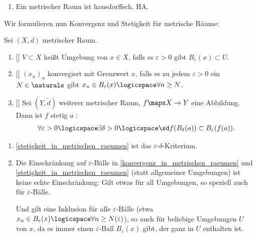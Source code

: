 \begin{bemerkungen}
\begin{enumerate}
\begin{proof}
        \end{proof}
        
        \item \label{metrischer_raum_ist_hausdorffsch} Ein metrischer Raum ist hausdorffsch. \tto HA\@.
        
    \end{enumerate}
\end{bemerkungen}
Wir formulieren nun Konvergenz und Stetigkeit für metrische Räume:
\begin{bemerkungen}
    Sei \( (X,d) \) metrischer Raum.
    \begin{enumerate}
        \item {}[]\label{umgebung_in_metrischen_raeumen} \( V\subset X \) heißt Umgebung von \( x\in X \), falls es \( \varepsilon >0 \) gibt \sd \( B_\varepsilon(x)\subset U \).
        \item {}[]\label{konvergenz_in_metrischen_raeumen} \( (x_n)_n \) konvergiert mit Grenzwert \( x \), falls es zu jedem \( \varepsilon>0 \) ein \( N\in \naturals \) gibt \sd \( x_n\in B_\varepsilon(x)\logicspace\forall n\geq N \).
        \item {}[]\label{stetigkeit_in_metrischen_raeumen} Sei \( (Y,\tilde{d}) \) weiterer metrischer Raum, \( f\maps X \to Y \) eine Abbildung. Dann ist \( f \) stetig \( a \) \gdw:
        \begin{align*}
            \forall\varepsilon>0\logicspace\exists \delta>0\logicspace\text{\sd} f(B_\delta(a))\subset B_\varepsilon(f(a)).
        \end{align*}
    \end{enumerate}
\end{bemerkungen}
\begin{bemerkungen*}
    \begin{enumerate}
        \item \ref{stetigkeit_in_metrischen_raeumen} ist das \( \varepsilon \)-\( \delta \)-Kriterium.
        \item Die Einschränkung auf \( \varepsilon \)-Bälle in \ref{konvergenz_in_metrischen_raeumen} und \ref{stetigkeit_in_metrischen_raeumen} (statt allgemeiner Umgebungen) ist keine echte Einschränkung: Gilt etwas für all Umgebungen, so speziell auch für \( \varepsilon \)-Bälle.
        
        Und gilt eine Inklusion für alle \( \varepsilon \)-Bälle (etwa \( x_n\in B_\varepsilon(x)\logicspace\forall n \geq N(\varepsilon) \)), so auch für beliebige Umgebungen \( U \) von \( x \), da es immer einen \( \varepsilon \)-Ball \( B_\varepsilon(x) \) gibt, der ganz in \( U \) enthalten ist.
    \end{enumerate}
\end{bemerkungen*}
